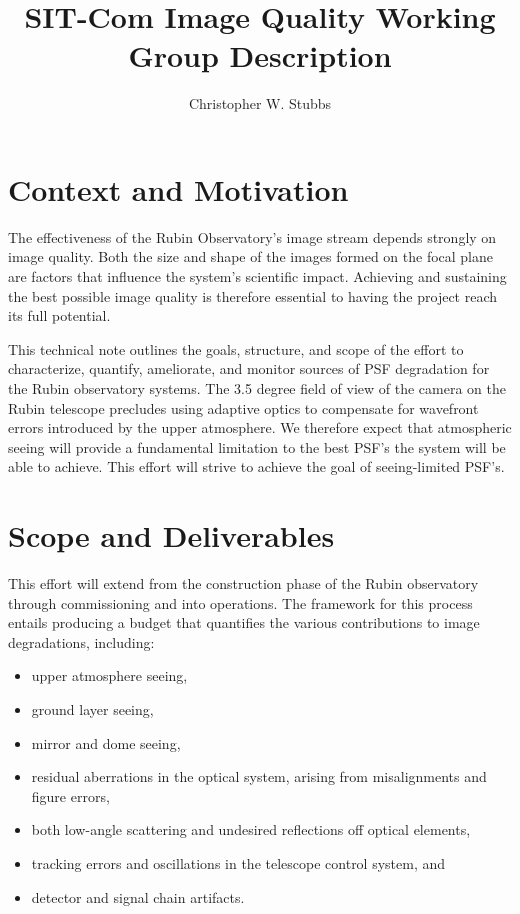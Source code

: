 \documentclass[SE,authoryear,toc]{lsstdoc}
\title{SIT-Com Image Quality Working Group Description}
\author{%
Christopher W. Stubbs
}
\date{\vcsDate}
\begin{document}
\maketitle


\section{Context and Motivation}

The effectiveness of the Rubin Observatory's image stream depends strongly on image quality.
Both the size and shape of the images formed on the focal plane are factors that influence the system's scientific impact.
Achieving and sustaining the best possible image quality is therefore essential to having the project reach its full potential.

This technical note outlines the goals, structure, and scope of the effort to characterize, quantify, ameliorate, and monitor sources of PSF degradation for the Rubin observatory systems.
The 3.5 degree field of view of the camera on the Rubin telescope precludes using adaptive optics to compensate for wavefront errors introduced by the upper atmosphere.
We therefore expect that atmospheric seeing will provide a fundamental limitation to the best PSF's the system will be able to achieve.
This effort will strive to achieve the goal of seeing-limited PSF's.

\section{Scope and Deliverables}

This effort will extend from the construction phase of the Rubin observatory through commissioning and into operations.
The framework for this process entails producing a budget that quantifies the various contributions to image degradations, including:
\begin{itemize}
\item upper atmosphere seeing,
\item ground layer seeing,
\item mirror and dome seeing,
\item residual aberrations in the optical system, arising from misalignments and figure errors,
\item both low-angle scattering and undesired reflections off optical elements,
\item tracking errors and oscillations in the telescope control system, and
\item detector and signal chain artifacts.
\end{itemize}
\end{document}
